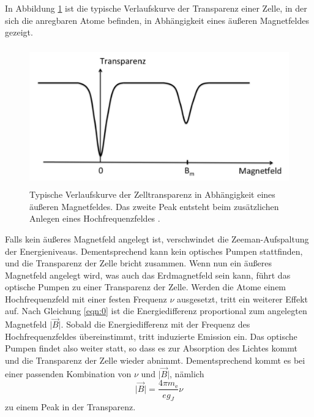 In Abbildung \ref{fig:theorie4} ist die typische Verlaufskurve der Transparenz einer Zelle, in der sich die anregbaren Atome befinden, in Abhängigkeit eines äußeren Magnetfeldes gezeigt.

\begin{figure}
  \centering
  \includegraphics[height=6cm]{ressources/theorie4.png}
  \caption{Typische Verlaufskurve der Zelltransparenz in Abhängigkeit eines äußeren Magnetfeldes. Das zweite Peak entsteht beim zusätzlichen Anlegen eines Hochfrequenzfeldes \cite{skript}.}
  \label{fig:theorie4}
\end{figure}

Falls kein äußeres Magnetfeld angelegt ist, verschwindet die Zeeman-Aufspaltung der Energieniveaus.
Dementsprechend kann kein optisches Pumpen stattfinden, und die Transparenz der Zelle bricht zusammen.
Wenn nun ein äußeres Magnetfeld angelegt wird, was auch das Erdmagnetfeld sein kann, führt das optische Pumpen zu einer Transparenz der Zelle.
Werden die Atome einem Hochfrequenzfeld mit einer festen Frequenz $\nu$ ausgesetzt, tritt ein weiterer Effekt auf.
Nach Gleichung \eqref{eqn:0} ist die Energiedifferenz proportional zum angelegten Magnetfeld $\lvert \vec{B} \rvert$.
Sobald die Energiedifferenz mit der Frequenz des Hochfrequenzfeldes übereinstimmt, tritt induzierte Emission ein.
Das optische Pumpen findet also weiter statt, so dass es zur Absorption des Lichtes kommt und die Transparenz der Zelle wieder abnimmt.
Dementsprechend kommt es bei einer passenden Kombination von $\nu$ und $\lvert \vec{B} \rvert$, nämlich
\begin{equation}
  \lvert \vec{B} \rvert = \frac{4 \pi m_\text{e}}{e g_J} \nu
  \label{eqn:resonanz}
\end{equation}
zu einem Peak in der Transparenz.

